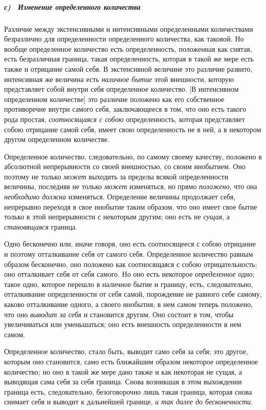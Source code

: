 {\subparagraph[с) \ Изменение определенного количества]{с) \ Изменение
определенного количества}
Различие между экстенсивными и интенсивными определенными количествами
безразлично для определенности определенного количества, как таковой. Но
вообще определенное количество есть определенность, положенная как снятая,
есть безразличная граница, такая определенность, которая в такой же мере
есть также и отрицание самой себя. В экстенсивной величине это различие
развито, интенсивная же величина есть {\em наличное
бытие} этой внешности, которую представляет собой внутри себя определенное
количество. [В интенсивном определенном количестве] это различие положено
как его собственное противоречие внутри самого себя, заключающееся в том,
что оно есть такого рода простая, {\em соотносящаяся с
собою} определенность, которая представляет собою отрицание самой себя,
имеет свою определенность не в ней, а в некотором другом определенном
количестве.

Определенное количество, следовательно, по самому своему качеству, положено
в абсолютной непрерывности со своей внешностью, со своим инобытием. Оно
поэтому не только {\em может} выходить за пределы
всякой определенности величины, последняя не только
{\em может} изменяться, но прямо
{\em положено}, что она
{\em необходимо должна} изменяться. Определение
величины продолжает себя, непрерывно переходя в свое инобытие таким
образом, что оно имеет свое бытие только в этой непрерывности с некоторым
другим; оно есть не {\em сущая}, а
{\em становящаяся} граница.

Одно бесконечно или, иначе говоря, оно есть соотносящееся с собою отрицание
и поэтому отталкивание себя от самого себя. Определенное количество равным
образом бесконечно, оно положено как соотносящаяся с собою отрицательность;
оно отталкивает себя от себя самого. Но оно есть некоторое
{\em определенное} одно; такое одно, которое перешло в
наличное бытие и границу, есть, следовательно, отталкивание определенности
от себя самой, порождение не равного себе самому, каково отталкивание
одного, а своего инобытия; в нем самом теперь положено, что оно
{\em выводит за себя} и становится другим. Оно состоит
в том, чтобы увеличиваться или уменьшаться; оно есть внешность
определенности в нем самом.

Определенное количество, стало быть, выводит само себя за себя; это другое,
которым оно становится, само есть ближайшим образом некоторое определенное
количество; но оно в такой же мере дано также и как некоторая не сущая, а
выводящая сама себя за себя граница. Снова возникшая в этом выхождении
граница есть, следовательно, безоговорочно лишь такая граница, которая
снова снимает себя и выводит к дальнейшей границе,
{\em и так далее до бесконечности}.

}
